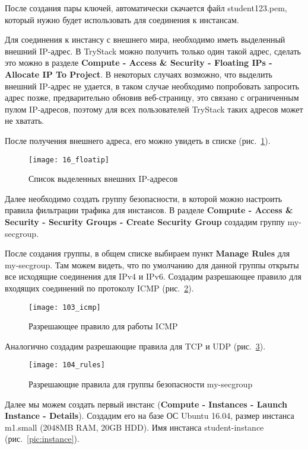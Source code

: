 После создания пары ключей, автоматически скачается файл student123.pem, который нужно будет использовать для соединения к инстансам.

Для соединения к инстансу с внешнего мира, необходимо иметь выделенный внешний IP-адрес.
В TryStack можно получить только один такой адрес, сделать это можно в разделе \textbf{Compute - Access \& Security - Floating IPs - Allocate IP To Project}.
В некоторых случаях возможно, что выделить внешний IP-адрес не удается, в таком случае необходимо попробовать запросить адрес позже, предварительно обновив веб-страницу, это связано с ограниченным пулом IP-адресов, поэтому для всех пользователей TryStack таких адресов может не хватать.

После получения внешнего адреса, его можно увидеть в списке (рис.~\ref{pic:float_ip}).
\begin{figure}[ht]
    \centering
    \texttt{[image: 16\_floatip]}
    \caption{Список выделенных внешних IP-адресов}\label{pic:float_ip}
\end{figure}

Далее необходимо создать группу безопасности, в которой можно настроить правила фильтрации трафика для инстансов.
В разделе \textbf{Compute - Access \& Security - Security Groups - Create Security Group} создадим группу my-secgroup.

После создания группы, в общем списке выбираем пункт \textbf{Manage Rules} для my-secgroup.
Там можем видеть, что по умолчанию для данной группы открыты все исходящие соединения для IPv4 и IPv6.
Создадим разрешающее правило для входящих соединений по протоколу ICMP (рис.~\ref{pic:icmp}).
\begin{figure}[ht]
    \centering
    \texttt{[image: 103\_icmp]}
    \caption{Разрешающее правило для работы ICMP}\label{pic:icmp}
\end{figure}

Аналогично создадим разрешающие правила для TCP и UDP (рис.~\ref{pic:rules}).
\begin{figure}[ht]
    \centering
    \texttt{[image: 104\_rules]}
    \caption{Разрешающие правила для группы безопасности my-secgroup}\label{pic:rules}
\end{figure}

\clearpage

Далее мы можем создать первый инстанс (\textbf{Compute - Instances - Launch Instance - Details}).
Создадим его на базе ОС Ubuntu 16.04, размер инстанса m1.small (2048MB RAM, 20GB HDD).
Имя инстанса student-instance (рис.~\ref{pic:instance}).

